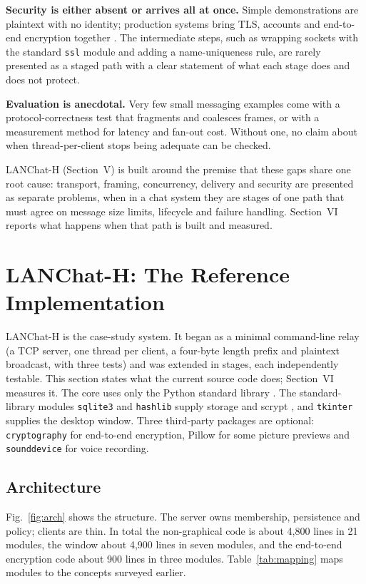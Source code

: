 \documentclass[conference]{IEEEtran}
\newcommand{\code}[1]{\texttt{#1}}
\begin{document}
\textbf{Security is either absent or arrives all at once.} Simple demonstrations are plaintext with no identity; production systems bring TLS, accounts and end-to-end encryption together \cite{rfc8446,unger,signal}. The intermediate steps, such as wrapping sockets with the standard \code{ssl} module and adding a name-uniqueness rule, are rarely presented as a staged path with a clear statement of what each stage does and does not protect.

\textbf{Evaluation is anecdotal.} Very few small messaging examples come with a protocol-correctness test that fragments and coalesces frames, or with a measurement method for latency and fan-out cost. Without one, no claim about when thread-per-client stops being adequate can be checked.

LANChat-H (Section~V) is built around the premise that these gaps share one root cause: transport, framing, concurrency, delivery and security are presented as separate problems, when in a chat system they are stages of one path that must agree on message size limits, lifecycle and failure handling. Section~VI reports what happens when that path is built and measured.

\section{LANChat-H: The Reference Implementation}
LANChat-H is the case-study system. It began as a minimal command-line relay (a TCP server, one thread per client, a four-byte length prefix and plaintext broadcast, with three tests) and was extended in stages, each independently testable. This section states what the current source code does; Section~VI measures it. The core uses only the Python standard library \cite{pysocket,pythreading,pystruct,pyssl}. The standard-library modules \code{sqlite3} and \code{hashlib} supply storage and scrypt \cite{pysqlite,pyhashlib}, and \code{tkinter} supplies the desktop window. Three third-party packages are optional: \code{cryptography} for end-to-end encryption, Pillow for some picture previews and \code{sounddevice} for voice recording.

\subsection{Architecture}
Fig.~\ref{fig:arch} shows the structure. The server owns membership, persistence and policy; clients are thin. In total the non-graphical code is about 4,800 lines in 21 modules, the window about 4,900 lines in seven modules, and the end-to-end encryption code about 900 lines in three modules. Table~\ref{tab:mapping} maps modules to the concepts surveyed earlier.
\end{document}
